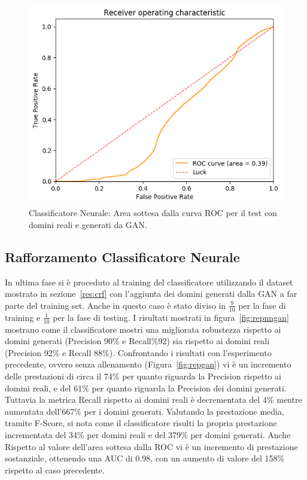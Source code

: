 \begin{figure}[!bp]
    \centering
    \includegraphics[width=\columnwidth]{figures/gan/roc_plot.png}
    \caption{Classificatore Neurale: Area sottesa dalla curva ROC per il test con domini reali e generati da GAN.\label{fig:rocgan}}
\end{figure}

\newpage
\subsection{Rafforzamento Classificatore Neurale}
In ultima fase si è proceduto al training del classificatore utilizzando il dataset mostrato in sezione~\ref{res:crf} con l'aggiunta dei domini generati dalla GAN a far parte del training set. Anche in questo caso è stato diviso in $\frac{9}{10}$ per la fase di training e $\frac{1}{10}$ per la fase di testing.
I risultati mostrati in figura~\ref{fig:repnngan} mostrano come il classificatore mostri una migliorata robustezza rispetto ai domini generati (Precision 90\% e Recall\%92) sia rispetto ai domini reali (Precision 92\% e Recall 88\%). Confrontando i risultati con l'esperimento precedente, ovvero senza allenamento (Figura~\ref{fig:repgan}) vi è un incremento delle prestazioni di circa il 74\% per quanto riguarda la Precision rispetto ai domini reali, e del 61\% per quanto riguarda la Precision dei domini generati. Tuttavia la metrica Recall rispetto ai domini reali è decrementata del 4\% mentre aumentata dell'667\% per i domini generati. Valutando la prestazione media, tramite F-Score, si nota come il classificatore risulti la propria prestazione incrementata del 34\% per domini reali e del 379\% per domini generati. 
Anche Rispetto al valore dell'area sottesa dalla ROC vi è un incremento di prestazione sostanziale, ottenendo una AUC di 0.98, con un aumento di valore del 158\% rispetto al caso precedente.

